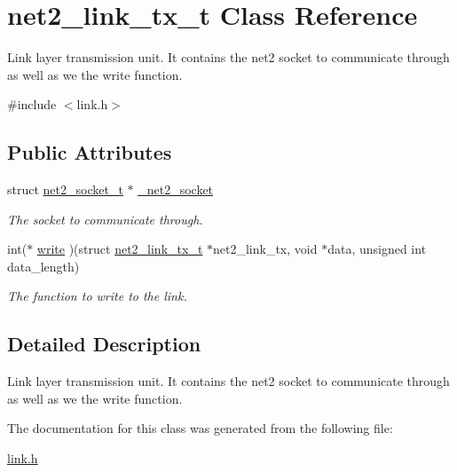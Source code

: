 \hypertarget{structnet2__link__tx__t}{\section{net2\-\_\-link\-\_\-tx\-\_\-t Class Reference}
\label{structnet2__link__tx__t}
}


Link layer transmission unit. It contains the net2 socket to communicate through as well as we the write function.  




{\ttfamily \#include $<$link.\-h$>$}

\subsection*{Public Attributes}
\begin{DoxyCompactItemize}
\item 
\hypertarget{structnet2__link__tx__t_a1477f4035255d5c451804403abe93d26}{struct \hyperlink{structnet2__socket__t}{net2\-\_\-socket\-\_\-t} $\ast$ \hyperlink{structnet2__link__tx__t_a1477f4035255d5c451804403abe93d26}{\-\_\-net2\-\_\-socket}}\label{structnet2__link__tx__t_a1477f4035255d5c451804403abe93d26}

\begin{DoxyCompactList}\small\item\em The socket to communicate through. \end{DoxyCompactList}\item 
\hypertarget{structnet2__link__tx__t_a96b3cabed416576fad4bbaa17caf043e}{int($\ast$ \hyperlink{structnet2__link__tx__t_a96b3cabed416576fad4bbaa17caf043e}{write} )(struct \hyperlink{structnet2__link__tx__t}{net2\-\_\-link\-\_\-tx\-\_\-t} $\ast$net2\-\_\-link\-\_\-tx, void $\ast$data, unsigned int data\-\_\-length)}\label{structnet2__link__tx__t_a96b3cabed416576fad4bbaa17caf043e}

\begin{DoxyCompactList}\small\item\em The function to write to the link. \end{DoxyCompactList}\end{DoxyCompactItemize}


\subsection{Detailed Description}
Link layer transmission unit. It contains the net2 socket to communicate through as well as we the write function. 

The documentation for this class was generated from the following file\-:\begin{DoxyCompactItemize}
\item 
\hyperlink{link_8h}{link.\-h}\end{DoxyCompactItemize}
